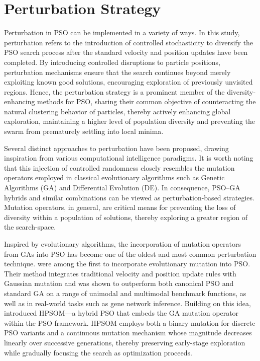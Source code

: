 {\section{Perturbation Strategy}

Perturbation in PSO can be implemented in a variety of ways.
In this study, perturbation refers to the introduction of controlled stochasticity to diversify the PSO search process after the standard velocity and position updates have been completed.
By introducing controlled disruptions to particle positions, perturbation mechanisms ensure that the search continues beyond merely exploiting known good solutions, encouraging exploration of previously unvisited regions.
Hence, 
the perturbation strategy is a prominent member of the diversity-enhancing methods for PSO, sharing their common objective of counteracting the natural clustering behavior of particles, thereby actively enhancing global exploration, maintaining a higher level of population diversity and preventing the swarm from prematurely settling into local minima.

Several distinct approaches to perturbation have been proposed, drawing inspiration from various computational intelligence paradigms.
It is worth noting that this injection of controlled randomness closely resembles the mutation operators employed in classical evolutionary algorithms such as Genetic Algorithms (GA) and Differential Evolution (DE).
In consequence, PSO–GA hybrids and similar combinations can be viewed as perturbation-based strategies. 
Mutation operators, in general, are critical means for preventing the loss of diversity within a population of solutions, thereby exploring a greater region of the \gls{search-space}.

Inspired by evolutionary algorithms, the incorporation of mutation operators from GAs into PSO has become one of the oldest and most common perturbation technique.
\citet{higashi2003gaussian} were among the first to incorporate evolutionary mutation into PSO. Their method integrates traditional velocity and position update rules with Gaussian mutation and was shown to outperform both canonical PSO and standard GA on a range of unimodal and multimodal benchmark functions, as well as in real-world tasks such as gene network inference.
Building on this idea, \citet{esmin2013hybrid} introduced HPSOM---a hybrid PSO that embeds the GA mutation operator within the PSO framework. HPSOM employs both a binary mutation for discrete PSO variants and a continuous mutation mechanism whose magnitude decreases linearly over successive generations, thereby preserving early-stage exploration while gradually focusing the search as optimization proceeds.

}
